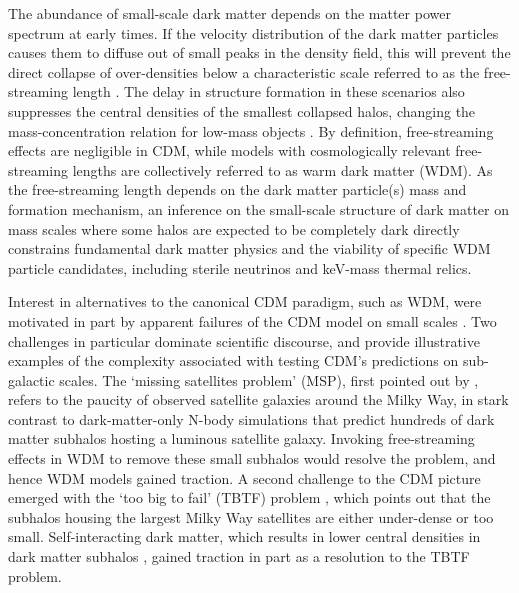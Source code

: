 The abundance of small-scale dark matter depends on the matter power spectrum at early times. If the velocity distribution of the dark matter particles causes them to diffuse out of small peaks in the density field, this will prevent the direct collapse of over-densities below a characteristic scale referred to as the free-streaming length \cite{Benson++13,Schneider++13}. The delay in structure formation in these scenarios also suppresses the central densities of the smallest collapsed halos, changing the mass-concentration relation for low-mass objects \cite{AvilaReese++01,Schneider++12,Maccio++13,Bose++16,Ludlow++16}. By definition, free-streaming effects are negligible in CDM, while models with cosmologically relevant free-streaming lengths are collectively referred to as warm dark matter (WDM). As the free-streaming length depends on the dark matter particle(s) mass and formation mechanism, an inference on the small-scale structure of dark matter on mass scales where some halos are expected to be completely dark directly constrains fundamental dark matter physics and the viability of specific WDM particle candidates, including sterile neutrinos \cite{Dodelson++94,ShiFuller99,AbazaijanKusenko19} and keV-mass thermal relics.  

Interest in alternatives to the canonical CDM paradigm, such as WDM, were motivated in part by apparent failures of the CDM model on small scales \cite[see][and references therein]{BullockBK17}. Two challenges in particular dominate scientific discourse, and provide illustrative examples of the complexity associated with testing CDM's predictions on sub-galactic scales. The `missing satellites problem' (MSP), first pointed out by \cite{Moore++99}, refers to the paucity of observed satellite galaxies around the Milky Way, in stark contrast to dark-matter-only N-body simulations that predict hundreds of dark matter subhalos hosting a luminous satellite galaxy. Invoking free-streaming effects in WDM to remove these small subhalos would resolve the problem, and hence WDM models gained traction. A second challenge to the CDM picture emerged with the `too big to fail' (TBTF) problem \cite{Boylan-Kolchin++11}, which points out that the subhalos housing the largest Milky Way satellites are either under-dense or too small. Self-interacting dark matter, which results in lower central densities in dark matter subhalos \cite[see][and references therein]{TulinYu18}, gained traction in part as a resolution to the TBTF problem. 

